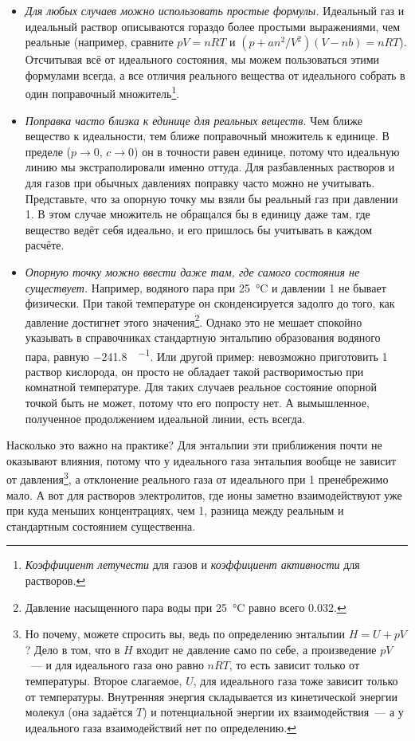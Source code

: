 \begin{itemize}
    \item \emph{Для любых случаев можно использовать простые формулы.} Идеальный газ и идеальный раствор описываются гораздо более простыми выражениями, чем реальные (например, сравните $pV = nRT$ и $\left(p + a n^2/V^2\right) (V - nb) = nRT$). Отсчитывая всё от идеального состояния, мы можем пользоваться этими формулами всегда, а все отличия реального вещества от идеального собрать в один поправочный множитель\footnote{\emph{Коэффициент летучести} для газов и \emph{коэффициент активности} для растворов.}.
    \item \emph{Поправка часто близка к единице для реальных веществ.} Чем ближе вещество к идеальности, тем ближе поправочный множитель к единице. В пределе ($p \rightarrow 0$, $c \rightarrow 0$) он в точности равен единице, потому что идеальную линию мы экстраполировали именно оттуда. Для разбавленных растворов и для газов при обычных давлениях поправку часто можно не учитывать. Представьте, что за опорную точку мы взяли бы реальный газ при давлении \qty{1}{\ruBar}. В этом случае множитель не обращался бы в единицу даже там, где вещество ведёт себя идеально, и его пришлось бы учитывать в каждом расчёте.
    \item \emph{Опорную точку можно ввести даже там, где самого состояния не существует.} Например, водяного пара при \qty{25}{\degreeCelsius} и давлении \qty{1}{\ruBar} не бывает физически. При такой температуре он сконденсируется задолго до того, как давление достигнет этого значения\footnote{Давление насыщенного пара воды при \qty{25}{\degreeCelsius} равно всего \qty{0,032}{\ruBar}.}. Однако это не мешает спокойно указывать в справочниках стандартную энтальпию образования водяного пара, равную \qty{-241,8}{\ruKJ\per\ruMole}. Или другой пример: невозможно приготовить \qty{1}{\ruMolar} раствор кислорода, он просто не обладает такой растворимостью при комнатной температуре. Для таких случаев реальное состояние опорной точкой быть не может, потому что его попросту нет. А вымышленное, полученное продолжением идеальной линии, есть всегда.
\end{itemize}

Насколько это важно на практике? Для энтальпии эти приближения почти не оказывают влияния, потому что у идеального газа энтальпия вообще не зависит от давления\footnote{Но почему, можете спросить вы, ведь по определению энтальпии $H = U + pV$? Дело в том, что в $H$ входит не давление само по себе, а произведение $pV$~--- и для идеального газа оно равно $nRT$, то есть зависит только от температуры. Второе слагаемое, $U$, для идеального газа тоже зависит только от температуры. Внутренняя энергия складывается из кинетической энергии молекул (она задаётся $T$) и потенциальной энергии их взаимодействия~--- а у идеального газа взаимодействий нет по определению.}, а отклонение реального газа от идеального при \qty{1}{\ruBar} пренебрежимо мало. А вот для растворов электролитов, где ионы заметно взаимодействуют уже при куда меньших концентрациях, чем \qty{1}{\ruMolar}, разница между реальным и стандартным состоянием существенна.

